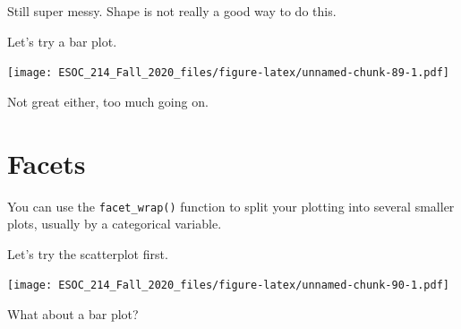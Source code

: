 \documentclass[
]{book}
\newenvironment{Shaded}{\begin{snugshade}}{\end{snugshade}}
\newcommand{\DataTypeTok}[1]{\textcolor[rgb]{0.13,0.29,0.53}{#1}}
\newcommand{\KeywordTok}[1]{\textcolor[rgb]{0.13,0.29,0.53}{\textbf{#1}}}
\newcommand{\NormalTok}[1]{#1}
\newcommand{\OperatorTok}[1]{\textcolor[rgb]{0.81,0.36,0.00}{\textbf{#1}}}
\newcommand{\StringTok}[1]{\textcolor[rgb]{0.31,0.60,0.02}{#1}}
\begin{document}
Still super messy. Shape is not really a good way to do this.

Let's try a bar plot.

\begin{Shaded}
\end{Shaded}

\texttt{[image: ESOC\_214\_Fall\_2020\_files/figure-latex/unnamed-chunk-89-1.pdf]}

Not great either, too much going on.

\hypertarget{facets}{%
\section{Facets}\label{facets}}

You can use the \texttt{facet\_wrap()} function to split your plotting into several smaller plots, usually by a categorical variable.

Let's try the scatterplot first.

\begin{Shaded}
\end{Shaded}

\texttt{[image: ESOC\_214\_Fall\_2020\_files/figure-latex/unnamed-chunk-90-1.pdf]}

What about a bar plot?

\begin{Shaded}
\end{Shaded}
\end{document}
